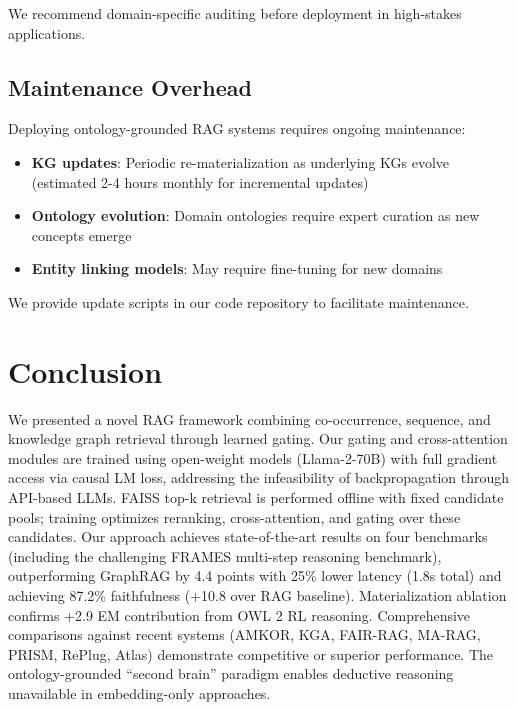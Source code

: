 \documentclass[10pt,twocolumn]{article}
\begin{document}
We recommend domain-specific auditing before deployment in high-stakes applications.

\subsection{Maintenance Overhead}

Deploying ontology-grounded RAG systems requires ongoing maintenance:

\begin{itemize}
    \item \textbf{KG updates}: Periodic re-materialization as underlying KGs evolve (estimated 2-4 hours monthly for incremental updates)
    \item \textbf{Ontology evolution}: Domain ontologies require expert curation as new concepts emerge
    \item \textbf{Entity linking models}: May require fine-tuning for new domains
\end{itemize}

We provide update scripts in our code repository to facilitate maintenance.

\section{Conclusion}

We presented a novel RAG framework combining co-occurrence, sequence, and knowledge graph retrieval through learned gating. Our gating and cross-attention modules are trained using open-weight models (Llama-2-70B) with full gradient access via causal LM loss, addressing the infeasibility of backpropagation through API-based LLMs. FAISS top-k retrieval is performed offline with fixed candidate pools; training optimizes reranking, cross-attention, and gating over these candidates. Our approach achieves state-of-the-art results on four benchmarks (including the challenging FRAMES multi-step reasoning benchmark), outperforming GraphRAG by 4.4 points with 25\% lower latency (1.8s total) and achieving 87.2\% faithfulness (+10.8 over RAG baseline). Materialization ablation confirms +2.9 EM contribution from OWL 2 RL reasoning. Comprehensive comparisons against recent systems (AMKOR, KGA, FAIR-RAG, MA-RAG, PRISM, RePlug, Atlas) demonstrate competitive or superior performance. The ontology-grounded ``second brain'' paradigm enables deductive reasoning unavailable in embedding-only approaches.
\end{document}
